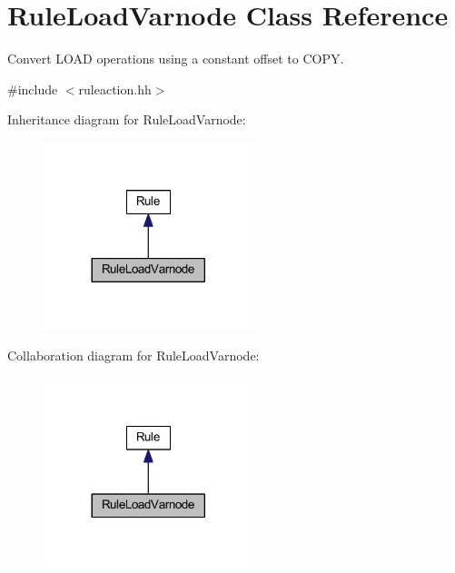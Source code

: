 \hypertarget{class_rule_load_varnode}{}\section{Rule\+Load\+Varnode Class Reference}
\label{class_rule_load_varnode}


Convert L\+O\+AD operations using a constant offset to C\+O\+PY.  




{\ttfamily \#include $<$ruleaction.\+hh$>$}



Inheritance diagram for Rule\+Load\+Varnode\+:
\nopagebreak
\begin{figure}[H]
\begin{center}
\leavevmode
\includegraphics[width=173pt]{class_rule_load_varnode__inherit__graph}
\end{center}
\end{figure}


Collaboration diagram for Rule\+Load\+Varnode\+:
\nopagebreak
\begin{figure}[H]
\begin{center}
\leavevmode
\includegraphics[width=173pt]{class_rule_load_varnode__coll__graph}
\end{center}
\end{figure}
